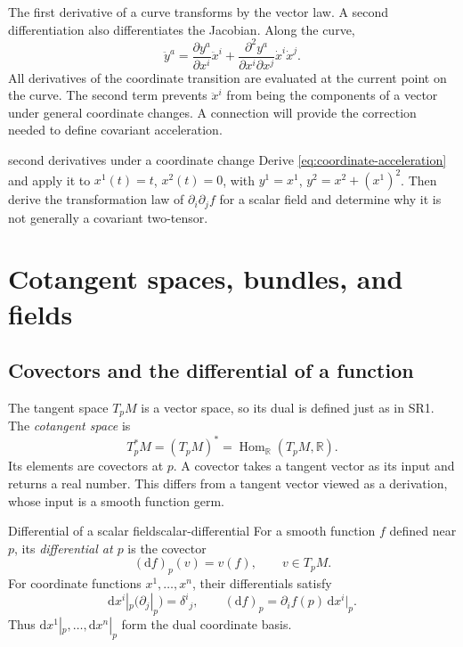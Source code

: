 \documentclass[11pt,a4paper]{article}
\numberwithin{equation}{section}
\newcommand{\R}{\mathbb R}
\newcommand{\dd}{\mathrm d}
\newcommand{\slideref}[1]{\par\nobreak\smallskip\nobreak{\footnotesize\color{ink!60}\textsc{Source slide #1}}\par\nobreak\smallskip\nobreak}
\begin{document}
The first derivative of a curve transforms by the vector law. A second
differentiation also differentiates the Jacobian. Along the curve,
\begin{equation}
 \ddot y^a
 =\frac{\partial y^a}{\partial x^i}\ddot x^i
  +\frac{\partial^2y^a}{\partial x^i\partial x^j}
       \dot x^i\dot x^j.
 \label{eq:coordinate-acceleration}
\end{equation}
All derivatives of the coordinate transition are evaluated at the current
point on the curve. The second term prevents \(\ddot x^i\) from being
the components of a vector under general coordinate changes. A connection
will provide the correction needed to define covariant acceleration.

\begin{studentwork}[3.6cm]{second derivatives under a coordinate change}
Derive \eqref{eq:coordinate-acceleration} and apply it to
\(x^1(t)=t\), \(x^2(t)=0\), with
\(y^1=x^1\), \(y^2=x^2+(x^1)^2\).
Then derive the transformation law of \(\partial_i\partial_j f\)
for a scalar field and determine why it is not generally a
covariant two-tensor.
\end{studentwork}

\section{Cotangent spaces, bundles, and fields}
\label{sec:bundles}
\slideref{10}

\subsection{Covectors and the differential of a function}

The tangent space \(T_pM\) is a vector space, so its dual is defined just
as in SR1. The \emph{cotangent space} is
\[
 T_p^*M=(T_pM)^*=\operatorname{Hom}_{\R}(T_pM,\R).
\]
Its elements are covectors at \(p\). A covector takes a tangent vector as
its input and returns a real number. This differs from a tangent vector
viewed as a derivation, whose input is a smooth function germ.

\begin{definition}{Differential of a scalar field}{scalar-differential}
For a smooth function \(f\) defined near \(p\), its \emph{differential at
\(p\)} is the covector
\[
 (\dd f)_p(v)=v(f),\qquad v\in T_pM.
\]
For coordinate functions \(x^1,\ldots,x^n\), their differentials satisfy
\begin{equation}
 \dd x^i|_p(\partial_j|_p)=\delta^i{}_j,
 \qquad
 (\dd f)_p=\partial_i f(p)\,\dd x^i|_p.
 \label{eq:df}
\end{equation}
Thus \(\dd x^1|_p,\ldots,\dd x^n|_p\) form the dual coordinate basis.
\end{definition}
\end{document}

